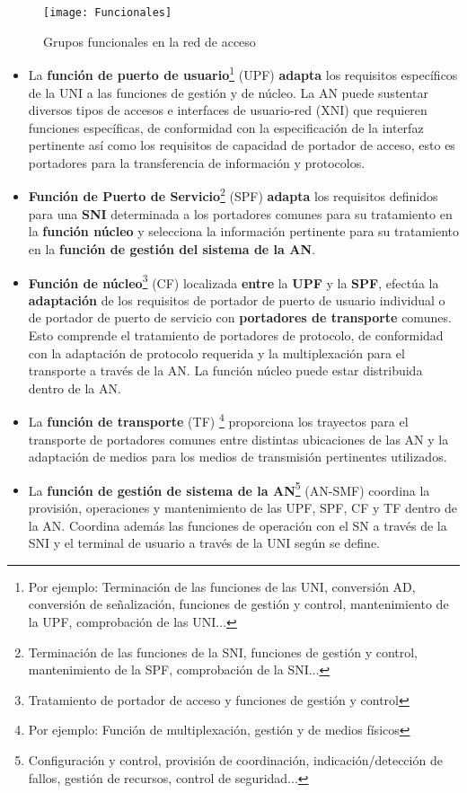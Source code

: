 \documentclass[10pt,portrait, twocolumn]{article}
\begin{document}
\begin{figure}[h]
	\centering
     \texttt{[image: Funcionales]}
      \caption{Grupos funcionales en la red de acceso}
      \label{fig:ONT}
  \end{figure}
  
\begin{itemize}
	\item La \textbf{función de puerto de usuario}\footnote{Por ejemplo: Terminación de las funciones de las UNI, conversión AD, conversión de señalización, funciones de gestión y control, mantenimiento de la UPF, comprobación de las UNI...} (UPF) \textbf{adapta} los requisitos específicos de la UNI a las funciones de gestión y de núcleo. La AN puede sustentar diversos tipos de accesos e interfaces de usuario-red (XNI) que requieren funciones específicas, de conformidad con la especificación de la interfaz pertinente así como los requisitos de capacidad de portador de acceso, esto es portadores para la transferencia de información y protocolos.
	\item \textbf{Función de Puerto de Servicio}\footnote{Terminación de las funciones de la SNI, funciones de gestión y control, mantenimiento de la SPF, comprobación de la SNI...} (SPF) \textbf{adapta} los requisitos definidos para una \textbf{SNI} determinada a los portadores comunes para su tratamiento en la \textbf{función núcleo} y selecciona la información pertinente para su tratamiento en la \textbf{función de gestión del sistema de la AN}.
	\item \textbf{Función de núcleo}\footnote{Tratamiento de portador de acceso y funciones de gestión y control} (CF) localizada \textbf{entre} la \textbf{UPF} y la \textbf{SPF}, efectúa la \textbf{adaptación} de los requisitos de portador de puerto de usuario individual o de portador de puerto de servicio con \textbf{portadores de transporte} comunes. Esto comprende el tratamiento de portadores de protocolo, de conformidad con la adaptación de protocolo requerida y la multiplexación para el transporte a través de la AN. La función núcleo puede estar distribuida dentro de la AN.
	\item La \textbf{función de transporte} (TF) \footnote{Por ejemplo: Función de multiplexación, gestión y de medios físicos} proporciona los trayectos para el transporte de portadores comunes entre distintas ubicaciones de las AN y la adaptación de medios para los medios de transmisión pertinentes utilizados.
	\item La \textbf{función de gestión de sistema de la AN}\footnote{Configuración y control, provisión de coordinación, indicación/detección de fallos, gestión de recursos, control de seguridad...} (AN-SMF) coordina la provisión, operaciones y mantenimiento de las UPF, SPF, CF y TF dentro de la AN. Coordina además las funciones de operación con el SN a través de la SNI y el terminal de usuario a través de la UNI según se define.
\end{itemize}
\end{document}
